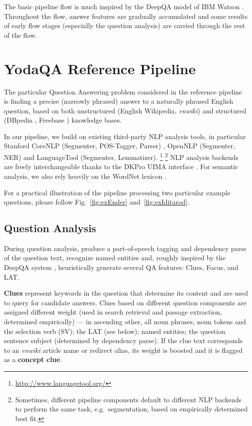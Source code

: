 \documentclass{poster15}
\begin{document}
The basic pipeline flow is much inspired by the DeepQA model
of IBM Watson \cite{WatsonPipeline}.  Throughout the flow, answer features
are gradually accumulated and some results of early flow stages (especially
the question analysis) are carried through the rest of the flow.


\section{YodaQA Reference Pipeline}
\label{sec:yodaqarefpip}

The particular Question Answering problem considered in the reference
pipeline is finding a precise (narrowly phrased) answer to a naturally
phrased English question, based on both unstructured (English Wikipedia,
\textit{enwiki})
and structured (DBpedia \cite{dbpedia}, Freebase \cite{freebase}) knowledge bases.

In our pipeline, we build on existing third-party NLP analysis tools,
in particular Stanford CoreNLP (Segmenter, POS-Tagger, Parser) \cite{StanfordCoreNLP} \cite{StanfordNNParser},
OpenNLP (Segmenter, NER) \cite{OpenNLP} and LanguageTool (Segmenter, Lemmatizer).%
\footnote{\url{http://www.languagetool.org/}}%
\footnote{Sometimes, different pipeline components default to different
NLP backends to perform the same task, e.g.\ segmentation,
based on empirically determined best fit.}
NLP analysis backends are freely interchangeable thanks
to the DKPro UIMA interface \cite{DKPro}.
For semantic analysis, we also rely heavily on the WordNet lexicon \cite{WordNet}.

For a practical illustration of the pipeline processing two particular example questions,
please follow Fig.~\ref{fig:exEnder} and~\ref{fig:exIditarod}.


\subsection{Question Analysis}

During question analysis,
produce a part-of-speech tagging and dependency parse of the question text,
recognize named entities and,
roughly inspired by the DeepQA system \cite{WatsonQuestion},
heuristically generate several QA features: Clues, Focus, and LAT.

\textbf{Clues} represent keywords in the question that determine its content
and are used to query for candidate answers.
Clues based on different question components are assigned different weight
(used in search retrieval and passage extraction, determined empirically) ---
in ascending other, all noun phrases, noun tokens and the selection verb (SV);
the LAT (see below);
named entities;
the question sentence subject (determined by dependency parse).
If the clue text corresponds to an \textit{enwiki} article name or redirect alias,
its weight is boosted and it is flagged as a \textbf{concept clue}.
\end{document}
